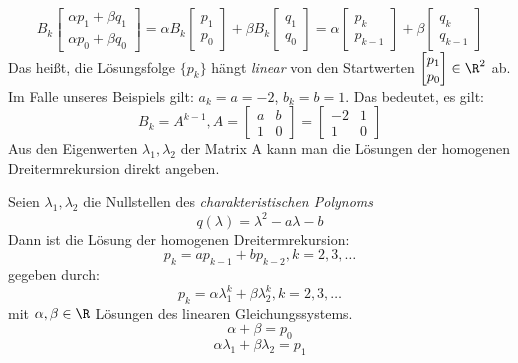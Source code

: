 \[
B_k \begin{bmatrix}
\alpha p_1 + \beta q_1 \\
\alpha p_0 + \beta q_0
\end{bmatrix} = \alpha B_k \begin{bmatrix}
p_1 \\
p_0
\end{bmatrix} + \beta B_k \begin{bmatrix}
q_1 \\
q_0
\end{bmatrix}= \alpha \begin{bmatrix}
p_k \\
p_{k-1}
\end{bmatrix} + \beta \begin{bmatrix}
q_k \\
q_{k-1}
\end{bmatrix}
\]
Das heißt, die Lösungsfolge $\{p_k\}$ hängt \emph{linear} von den Startwerten
$\begin{bmatrix}
p_1 \\
p_0
\end{bmatrix} \in \R^2$ ab.
Im Falle unseres Beispiels gilt: $a_k=a=-2$, $b_k=b=1$. Das bedeutet, es gilt:
\[
B_k= A^{k-1}, A= \begin{bmatrix}
	a & b \\
	1 & 0
\end{bmatrix} = \begin{bmatrix}
	-2 & 1 \\
	1 & 0
\end{bmatrix}
\]
Aus den Eigenwerten $\lambda_1, \lambda_2$ der Matrix A kann man die Lösungen der homogenen Dreitermrekursion direkt angeben.
\begin{theorem}
	\label{thm:nst-polynom}
	Seien $\lambda_1, \lambda_2$ die Nullstellen des \emph{charakteristischen Polynoms}
	\begin{equation}
	\label{eqn:charpolynom}
	q(\lambda) = \lambda^2 -a \lambda -b
	\end{equation}
Dann ist die Lösung der homogenen Dreitermrekursion:
\[
p_k=ap_{k-1} +bp_{k-2}, k=2,3,\ldots
\]
gegeben durch:
\[
p_k= \alpha \lambda_1^{k}+\beta \lambda_2^{k}, k=2,3,\ldots
\]
mit $\alpha, \beta \in \R$ Lösungen des linearen Gleichungssystems.
\[
\alpha + \beta =p_0
\]
\[
\alpha \lambda_1 + \beta \lambda_2 =p_1
\]
\end{theorem}
